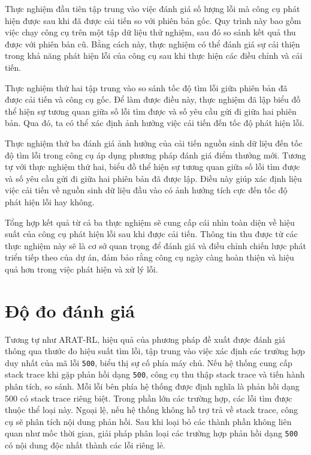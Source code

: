 Thực nghiệm đầu tiên tập trung vào việc đánh giá số lượng lỗi mà công cụ phát hiện được sau khi đã được cải tiến so với phiên bản gốc. Quy trình này bao gồm việc chạy công cụ trên một tập dữ liệu thử nghiệm, sau đó so sánh kết quả thu được với phiên bản cũ. Bằng cách này, thực nghiệm có thể đánh giá sự cải thiện trong khả năng phát hiện lỗi của công cụ sau khi thực hiện các điều chỉnh và cải tiến.

Thực nghiệm thứ hai tập trung vào so sánh tốc độ tìm lỗi giữa phiên bản đã được cải tiến và công cụ gốc. Để làm được điều này, thực nghiệm đã lập biểu đồ thể hiện sự tương quan giữa số lỗi tìm được và số yêu cầu gửi đi giữa hai phiên bản. Qua đó, ta có thể xác định ảnh hưởng việc cải tiến  đến tốc độ phát hiện lỗi.

Thực nghiệm thứ ba đánh giá ảnh hưởng của cải tiến nguồn sinh dữ liệu đến tốc độ tìm lỗi trong công cụ áp dụng phương pháp đánh giá điểm thưởng mới. Tương tự với thực nghiệm thứ hai, biểu đồ thể hiện sự tương quan giữa số lỗi tìm được và số yêu cầu gửi đi giữa hai phiên bản đã được lập. Điều này giúp xác định liệu việc cải tiến về nguồn sinh dữ liệu đầu vào có ảnh hưởng tích cực đến tốc độ phát hiện lỗi hay không.

Tổng hợp kết quả từ cả ba thực nghiệm sẽ cung cấp cái nhìn toàn diện về hiệu suất của công cụ phát hiện lỗi sau khi được cải tiến. Thông tin thu được từ các thực nghiệm này sẽ là cơ sở quan trọng để đánh giá và điều chỉnh chiến lược phát triển tiếp theo của dự án, đảm bảo rằng công cụ ngày càng hoàn thiện và hiệu quả hơn trong việc phát hiện và xử lý lỗi.






\section{Độ đo đánh giá}


Tương tự như ARAT-RL, hiệu quả của phương pháp đề xuất được đánh giá thông qua thước đo hiệu suất tìm lỗi, tập trung vào việc xác định các trường hợp duy nhất của mã lỗi \texttt{500}, biểu thị sự cố phía máy chủ. Nếu hệ thống cung cấp stack trace khi gặp phản hồi dạng \texttt{500}, công cụ thu thập stack trace và tiến hành phân tích, so sánh. Mỗi lỗi bên phía hệ thống được định nghĩa là phản hồi dạng 500 có stack trace riêng biệt. Trong phần lớn các trường hợp, các lỗi tìm được thuộc thể loại này. Ngoại lệ, nếu hệ thống không hỗ trợ trả về stack trace, công cụ sẽ phân tích nội dung phản hồi. Sau khi loại bỏ các thành phần không liên quan như mốc thời gian, giải pháp phân loại các trường hợp phản hồi dạng \texttt{500} có nội dung độc nhất thành các lỗi riêng lẻ.

